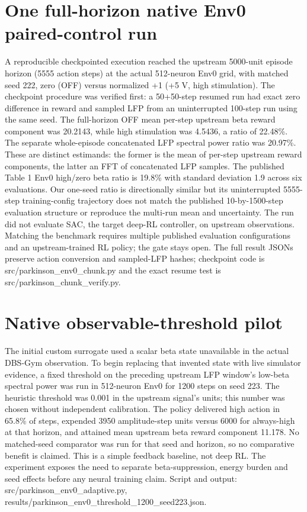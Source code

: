 \section{One full-horizon native Env0 paired-control run}
A reproducible checkpointed execution reached the upstream 5000-unit episode horizon (5555 action steps) at the actual 512-neuron Env0 grid, with matched seed 222, zero (OFF) versus normalized +1 (+5 V, high stimulation). The checkpoint procedure was verified first: a 50+50-step resumed run had exact zero difference in reward and sampled LFP from an uninterrupted 100-step run using the same seed. The full-horizon OFF mean per-step upstream beta reward component was 20.2143, while high stimulation was 4.5436, a ratio of 22.48\%. The separate whole-episode concatenated LFP spectral power ratio was 20.97\%. These are distinct estimands: the former is the mean of per-step upstream reward components, the latter an FFT of concatenated LFP samples. The published Table 1 Env0 high/zero beta ratio is 19.8\% with standard deviation 1.9 across six evaluations. Our one-seed ratio is directionally similar but its uninterrupted 5555-step training-config trajectory does not match the published 10-by-1500-step evaluation structure or reproduce the multi-run mean and uncertainty. The run did not evaluate SAC, the target deep-RL controller, on upstream observations. Matching the benchmark requires multiple published evaluation configurations and an upstream-trained RL policy; the gate stays open. The full result JSONs preserve action conversion and sampled-LFP hashes; checkpoint code is src/parkinson\_env0\_chunk.py and the exact resume test is src/parkinson\_chunk\_verify.py.

\section{Native observable-threshold pilot}
The initial custom surrogate used a scalar beta state unavailable in the actual DBS-Gym observation. To begin replacing that invented state with live simulator evidence, a fixed threshold on the preceding upstream LFP window's low-beta spectral power was run in 512-neuron Env0 for 1200 steps on seed 223. The heuristic threshold was 0.001 in the upstream signal's units; this number was chosen without independent calibration. The policy delivered high action in 65.8\% of steps, expended 3950 amplitude-step units versus 6000 for always-high at that horizon, and attained mean upstream beta reward component 11.178. No matched-seed comparator was run for that seed and horizon, so no comparative benefit is claimed. This is a simple feedback baseline, not deep RL. The experiment exposes the need to separate beta-suppression, energy burden and seed effects before any neural training claim. Script and output: src/parkinson\_env0\_adaptive.py, results/parkinson\_env0\_threshold\_1200\_seed223.json.

